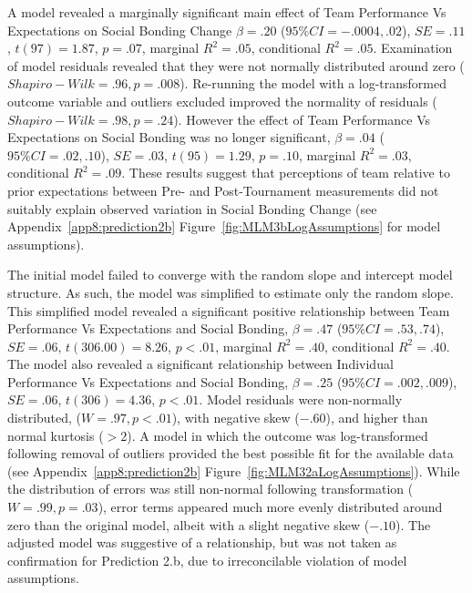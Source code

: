 \begin{CJK}{UTF8}{gbsn}
  A model revealed a marginally significant main effect of Team Performance Vs Expectations on Social Bonding Change $\beta = .20$ ($95\% CI =  -.0004, .02$), $SE = .11$, $t(97) = 1.87$, $p = .07$, marginal $R^2 = .05$, conditional $R^2 = .05$.  Examination of model residuals revealed that they were not normally distributed around zero ($Shapiro-Wilk = .96, p = .008$).  Re-running the model with a log-transformed outcome variable and outliers excluded improved the normality of residuals ($Shapiro-Wilk = .98, p = .24$).
  However the effect of Team Performance Vs Expectations on Social Bonding was no longer significant, $\beta = .04$ ($95\% CI =  .02, .10$), $SE = .03$, $t(95) = 1.29$, $p = .10$, marginal $R^2 = .03$, conditional $R^2 = .09$.  These results suggest that perceptions of team relative to prior expectations between Pre- and Post-Tournament measurements did not suitably explain observed variation in Social Bonding Change (see Appendix~\ref{app8:prediction2b} Figure~\ref{fig:MLM3bLogAssumptions} for model assumptions).



  The initial model failed to converge with the random slope and intercept model structure.  As such, the model was simplified to estimate only the random slope. This simplified model revealed a significant positive relationship between Team Performance Vs Expectations and Social Bonding, $\beta = .47$ ($95\% CI =  .53, .74$), $SE = .06$, $t(306.00) = 8.26$, $p < .01$, marginal $R^2 = .40$, conditional $R^2 = .40$.  The model also revealed a significant relationship between Individual Performance Vs Expectations and Social Bonding, $\beta = .25$ ($95\% CI =  .002, .009$), $SE = .06$, $t(306) = 4.36$, $p < .01$.  Model residuals were non-normally distributed, ($W = .97, p < .01$), with negative skew ($-.60$), and higher than normal kurtosis ($> 2$).  A model in which the outcome was log-transformed following removal of outliers provided the best possible fit for the available data (see Appendix~\ref{app8:prediction2b} Figure~\ref{fig:MLM32aLogAssumptions}).  While the distribution of errors was still non-normal following transformation ($W = .99, p = .03$),  error terms appeared much more evenly distributed around zero than the original model, albeit with a slight negative skew ($-.10$).
  The adjusted model was suggestive of a relationship, but was not taken as confirmation for Prediction 2.b, due to irreconcilable violation of model assumptions.


\end{CJK}
